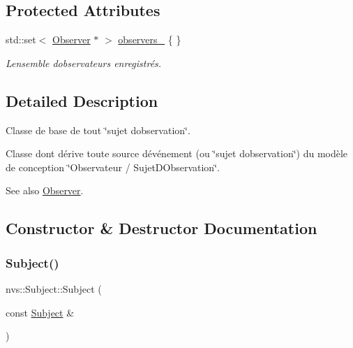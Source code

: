\subsection*{Protected Attributes}
\begin{DoxyCompactItemize}
\item 
\mbox{\label{classnvs_1_1_subject_a71448bb8a51b098168d010dfe854450c}} 
std\+::set$<$ \mbox{\hyperlink{classnvs_1_1_observer}{Observer}} $\ast$ $>$ \mbox{\hyperlink{classnvs_1_1_subject_a71448bb8a51b098168d010dfe854450c}{observers\+\_\+}} \{ \}
\begin{DoxyCompactList}\small\item\em L\textquotesingle{}ensemble d\textquotesingle{}observateurs enregistrés. \end{DoxyCompactList}\end{DoxyCompactItemize}


\subsection{Detailed Description}
Classe de base de tout \char`\"{}sujet d\textquotesingle{}observation\char`\"{}. 

Classe dont dérive toute source d\textquotesingle{}événement (ou \char`\"{}sujet d\textquotesingle{}observation\char`\"{}) du modèle de conception \char`\"{}\+Observateur / Sujet\+D\+Observation\char`\"{}.

\begin{DoxySeeAlso}{See also}
\mbox{\hyperlink{classnvs_1_1_observer}{Observer}}. 
\end{DoxySeeAlso}


\subsection{Constructor \& Destructor Documentation}
\mbox{\label{classnvs_1_1_subject_acb8bf74c98c8ec96d999ce98cd3fab22}} 
\subsubsection{\texorpdfstring{Subject()}{Subject()}\hspace{0.1cm}{\footnotesize\ttfamily [1/2]}}
{\footnotesize\ttfamily nvs\+::\+Subject\+::\+Subject (\begin{DoxyParamCaption}\item[{const \mbox{\hyperlink{classnvs_1_1_subject}{Subject}} \&}]{ }\end{DoxyParamCaption})\hspace{0.3cm}{\ttfamily [default]}}



